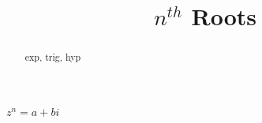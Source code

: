 \documentclass{ximera}
\title{$n^{th}$ Roots}
\begin{document}
\begin{abstract}
exp, trig, hyp
\end{abstract}
\maketitle








$z^n = a + b i$
\end{document}
